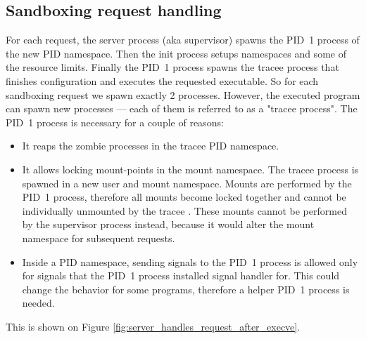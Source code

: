 \documentclass[en]{pracamgr}
\begin{document}
\subsection{Sandboxing request handling}

For each request, the server process (aka supervisor) spawns the PID~1 process of the new PID namespace. Then the init process setups namespaces and some of the resource limits. Finally the PID~1 process spawns the tracee process that finishes configuration and executes the requested executable. So for each sandboxing request we spawn exactly 2 processes. However, the executed program can spawn new processes --- each of them is referred to as a "tracee process". The PID~1 process is necessary for a couple of reasons:
\begin{itemize}
    \item It reaps the zombie processes in the tracee PID namespace.
    \item It allows locking mount-points in the mount namespace. The tracee process is spawned in a new user and mount namespace. Mounts are performed by the PID~1 process, therefore all mounts become locked together and cannot be individually unmounted by the tracee \cite{man_mount_namespaces}. These mounts cannot be performed by the supervisor process instead, because it would alter the mount namespace for subsequent requests.
    \item Inside a PID namespace, sending signals to the PID~1 process is allowed only for signals that the PID~1 process installed signal handler for. This could change the behavior for some programs, therefore a helper PID~1 process is needed.
\end{itemize}

This is shown on Figure \ref{fig:server_handles_request_after_execve}.
\end{document}
